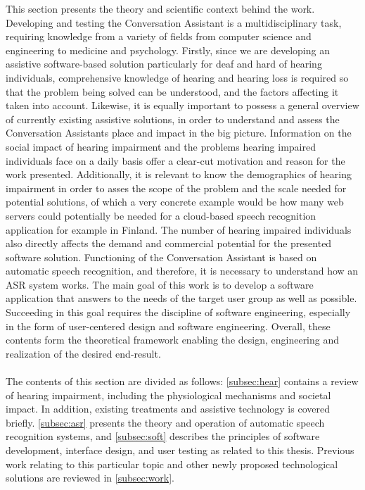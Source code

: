 \documentclass[english, 12pt, a4paper, pdftex, elec, utf8]{aaltothesis}
\begin{document}
This section presents the theory and scientific context behind the work. Developing and testing the Conversation Assistant is a multidisciplinary task, requiring knowledge from a variety of fields from computer science and engineering to medicine and psychology. Firstly, since we are developing an assistive software-based solution particularly for deaf and hard of hearing individuals, comprehensive knowledge of hearing and hearing loss is required so that the problem being solved can be understood, and the factors affecting it taken into account. Likewise, it is equally important to possess a general overview of currently existing assistive solutions, in order to understand and assess the Conversation Assistants place and impact in the big picture. Information on the social impact of hearing impairment and the problems hearing impaired individuals face on a daily basis offer a clear-cut motivation and reason for the work presented. Additionally, it is relevant to know the demographics of hearing impairment in order to asses the scope of the problem and the scale needed for potential solutions, of which a very concrete example would be how many web servers could potentially be needed for a cloud-based speech recognition application for example in Finland. The number of hearing impaired individuals also directly affects the demand and commercial potential for the presented software solution. Functioning of the Conversation Assistant is based on automatic speech recognition, and therefore, it is necessary to understand how an ASR system works. The main goal of this work is to develop a software application that answers to the needs of the target user group as well as possible. Succeeding in this goal requires the discipline of software engineering, especially in the form of user-centered design and software engineering. Overall, these contents form the theoretical framework enabling the design, engineering and realization of the desired end-result. \\\\
The contents of this section are divided as follows: \ref{subsec:hear} contains a review of hearing impairment, including the physiological mechanisms and societal impact. In addition, existing treatments and assistive technology is covered briefly. \ref{subsec:asr} presents the theory and operation of automatic speech recognition systems, and \ref{subsec:soft} describes the principles of software development, interface design, and user testing as related to this thesis. Previous work relating to this particular topic and other newly proposed technological solutions are reviewed in \ref{subsec:work}.
\end{document}
